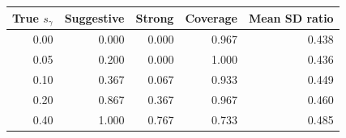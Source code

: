 \begin{tabular}{@{}rrrrr@{}}
\toprule
True $s_\gamma$ & Suggestive & Strong & Coverage & Mean SD ratio \\
\midrule
0.00 & 0.000 & 0.000 & 0.967 & 0.438 \\
0.05 & 0.200 & 0.000 & 1.000 & 0.436 \\
0.10 & 0.367 & 0.067 & 0.933 & 0.449 \\
0.20 & 0.867 & 0.367 & 0.967 & 0.460 \\
0.40 & 1.000 & 0.767 & 0.733 & 0.485 \\
\bottomrule
\end{tabular}
